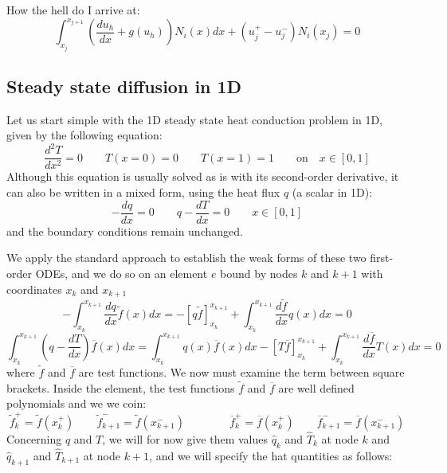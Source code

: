 How the hell do I arrive at:
\[
\int_{x_j}^{x_{j+1}} \left( \frac{d u_h}{dx} + g(u_h) \right) N_i(x) dx + (u_j^+-u_j^-) N_i(x_j) = 0
\]

\newpage
\subsection{Steady state diffusion in 1D}

Let us start simple with the 1D steady state heat conduction problem in 1D, given by the following 
equation:
\begin{equation}
\frac{d^2T}{dx^2}=0 \qquad T(x=0)=0 \qquad T(x=1)=1 \qquad \text{on} \quad x\in[0,1]
\end{equation}
Although this equation is usually solved as is with its second-order derivative, it can also 
be written in a mixed form, using the heat flux $q$ (a scalar in 1D):
\[
-\frac{dq}{dx}=0 \qquad q-\frac{dT}{dx}=0 \qquad x\in[0,1]
\]
and the boundary conditions remain unchanged. 

We apply the standard approach to establish the weak forms of these two first-order ODEs, and we do so 
on an element $e$ bound by nodes $k$ and $k+1$ with coordinates $x_k$ and $x_{k+1}$
\[
-\int_{x_k}^{x_{k+1}} \frac{dq}{dx} \tilde{f}(x) dx = -[q \tilde{f} ]_{x_k}^{x_{k+1}} 
+ \int_{x_k}^{x_{k+1}} \frac{d\tilde{f}}{dx} q(x) dx = 0
\]
\[
\int_{x_k}^{x_{k+1}}  \left( q-\frac{dT}{dx} \right) \overline{f}(x) dx
=
\int_{x_k}^{x_{k+1}}  q(x) \overline{f}(x) dx
-[ T \overline{f}  ]_{x_k}^{x_{k+1}} + \int_{x_k}^{x_{k+1}} \frac{d\overline{f}}{dx} T(x) dx = 0
\]
where $\tilde{f}$ and $\overline{f}$ are test functions.
We now must examine the term between square brackets. 
Inside the element, the test functions $\tilde{f}$ and $\overline{f}$ are well defined polynomials
and we we coin:
\[
\tilde{f}_k^+=\tilde{f}(x_k^+)
\qquad
\tilde{f}_{k+1}^-=\tilde{f}(x_{k+1}^-)
\qquad
\qquad
\overline{f}_k^+=\overline{f}(x_k^+)
\qquad
\overline{f}_{k+1}^-=\overline{f}(x_{k+1}^-)
\]
Concerning $q$ and $T$, we will for now  give them values $\hat{q}_k$ and $\hat{T}_k$ at node $k$
and $\hat{q}_{k+1}$ and $\hat{T}_{k+1}$ at node $k+1$, and we will specify the hat quantities as follows:


